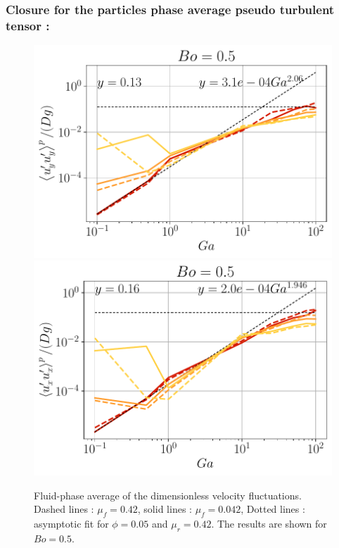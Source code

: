 \documentclass[aspectratio=169]{beamer}
\begin{document}
\begin{frame}
  \frametitle{Closure for the particles phase average pseudo turbulent tensor : }
  \begin{figure}[h!]
    \centering
    \includegraphics[height=0.5\textheight]{image/N_10/UU/UU_pyy_Bo_0_5.pdf}
    \includegraphics[height=0.5\textheight]{image/N_10/UU/UU_pxx_Bo_0_5.pdf}
    \caption{Fluid-phase average of the dimensionless velocity fluctuations. Dashed lines : $\mu_f = 0.42$, solid lines : $\mu_f = 0.042$, Dotted lines : asymptotic fit for $\phi = 0.05$ and $\mu_r = 0.42$. The results are shown for $Bo = 0.5$.} 
    \label{fig:UUp}
  \end{figure}
  

\end{frame}
\end{document}
